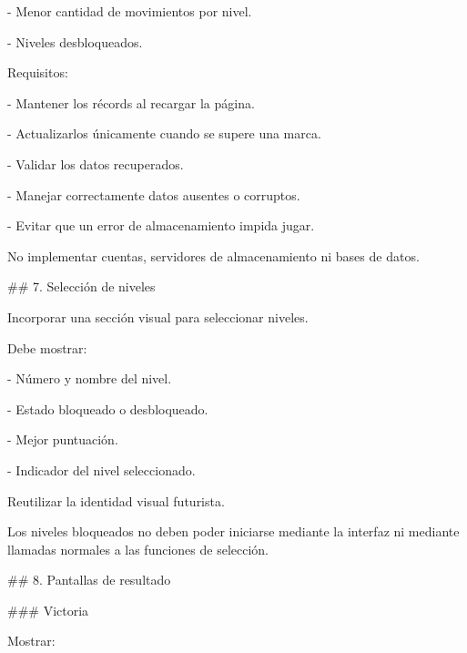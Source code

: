 \noindent - Menor cantidad de movimientos por nivel.\par
\noindent - Niveles desbloqueados.\par
\par\smallskip
\noindent Requisitos:\par
\par\smallskip
\noindent - Mantener los récords al recargar la página.\par
\noindent - Actualizarlos únicamente cuando se supere una marca.\par
\noindent - Validar los datos recuperados.\par
\noindent - Manejar correctamente datos ausentes o corruptos.\par
\noindent - Evitar que un error de almacenamiento impida jugar.\par
\par\smallskip
\noindent No implementar cuentas, servidores de almacenamiento ni bases de datos.\par
\par\smallskip
\noindent \#\# 7. Selección de niveles\par
\par\smallskip
\noindent Incorporar una sección visual para seleccionar niveles.\par
\par\smallskip
\noindent Debe mostrar:\par
\par\smallskip
\noindent - Número y nombre del nivel.\par
\noindent - Estado bloqueado o desbloqueado.\par
\noindent - Mejor puntuación.\par
\noindent - Indicador del nivel seleccionado.\par
\par\smallskip
\noindent Reutilizar la identidad visual futurista.\par
\par\smallskip
\noindent Los niveles bloqueados no deben poder iniciarse mediante la interfaz ni mediante llamadas normales a las funciones de selección.\par
\par\smallskip
\noindent \#\# 8. Pantallas de resultado\par
\par\smallskip
\noindent \#\#\# Victoria\par
\par\smallskip
\noindent Mostrar:\par
